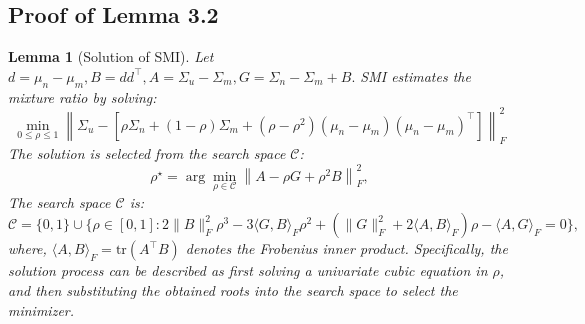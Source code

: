 \documentclass{article}
\theoremstyle{plain}
\newtheorem{lemma}[theorem]{Lemma}
\theoremstyle{definition}
\theoremstyle{remark}
\begin{document}
\subsection{Proof of Lemma 3.2} \label{L3.2}
\begin{lemma}[Solution of SMI]
Let
$d=\mu_n-\mu_m,B=dd^\top,
A=\Sigma_u-\Sigma_m,
G=\Sigma_n-\Sigma_m+B .$
SMI estimates the mixture ratio by solving:
\begin{equation}
\min_{0\le\rho\le 1}\left\|
\Sigma_u-
\left[
\rho \Sigma_n+(1-\rho)\Sigma_m
+(\rho-\rho^2)(\mu_n-\mu_m)(\mu_n-\mu_m)^\top
\right]
\right\|^2_F
\end{equation}
The solution is selected from the search space $\mathcal C$:
\begin{equation}
\rho^\star=
\arg\min_{\rho\in\mathcal C}
\left\|A-\rho G+\rho^2 B\right\|_F^2, \label{SMI-J}
\end{equation}
The search space $\mathcal C$ is:
\begin{equation}
\mathcal C
=
\{0,1\}
\cup
\Big\{
\rho\in[0,1]:
2\|B\|_F^2\rho^3
-3\langle G,B\rangle_F\rho^2 +
\left(\|G\|_F^2+2\langle A,B\rangle_F\right)\rho
-\langle A,G\rangle_F
=0
\Big\},
\end{equation}
where, \(\langle A,B\rangle_F=\mathrm{tr}(A^\top B)\) denotes the Frobenius inner product. Specifically, the solution process can be described as first solving a univariate cubic equation in $\rho$, and then substituting the obtained roots into the search space to select the minimizer.
\end{lemma}
\end{document}
